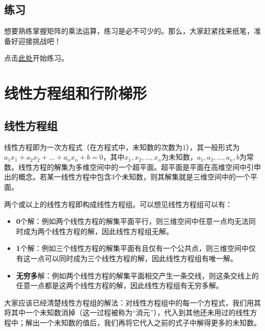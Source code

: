\documentclass{ctexart}
\begin{document}
\subsection{练习}
想要熟练掌握矩阵的乘法运算，练习是必不可少的。那么，大家赶紧找来纸笔，准备好迎接挑战吧！
\par
点击\href{https://www.khanacademy.org/math/precalculus/x9e81a4f98389efdf:matrices/x9e81a4f98389efdf:multiplying-matrices-by-matrices/e/multiplying_a_matrix_by_a_matrix}{此处}开始练习。

\section{线性方程组和行阶梯形}
\subsection{线性方程组}
线性方程即为一次方程式（在方程式中，未知数的次数为1），其一般形式为$a_1x_1+a_2x_2+\dots+a_nx_n+b=0$，其中$x_1, x_2, \dots, x_n$为未知数，$a_1, a_2, \dots, a_n, b$为常数。线性方程的解集为多维空间中的一个超平面。超平面是平面在高维空间中引申出的概念。若某一线性方程中包含3个未知数，则其解集就是三维空间中的一个平面。
\par
两个或以上的线性方程即构成线性方程组。可以想见线性方程组可以有：
\begin{itemize}
    \item \textbf{0}个解：例如两个线性方程的解集平面平行，则三维空间中任意一点均无法同时成为两个线性方程的解，因此线性方程组无解。
    \item \textbf{1}个解：例如三个线性方程的解集平面有且仅有一个公共点，则三维空间中仅有这一点可以同时成为三个线性方程的解，因此线性方程组有唯一解。
    \item \textbf{无穷多}解：例如两个线性方程的解集平面相交产生一条交线，则这条交线上的任意一点都是这两个线性方程的解，因此线性方程组有无穷多解。
\end{itemize}
\par
大家应该已经清楚线性方程组的解法：对线性方程组中的每一个方程式，我们用其将其中一个未知数消掉（这一过程被称为“消元”），代入到其他还未用过的线性方程中；解出一个未知数的值后，我们再将它代入之前的式子中解得更多的未知数。
\end{document}
